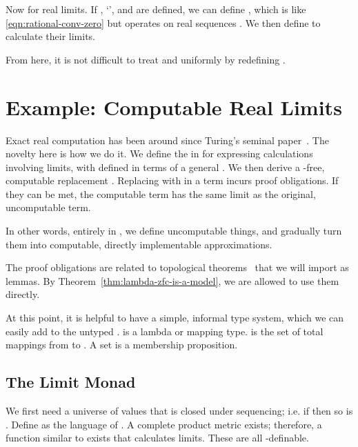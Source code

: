 Now for real limits. If \tlzfc{\Re^+}, `\tlzfc{<}', and \tlzfc{|\cdot|} are defined, we can define , which is like \eqref{eqn:rational-conv-zero} but operates on real sequences . We then define  to calculate their limits.

From here, it is not difficult to treat \tlzfc{\Rat} and \tlzfc{\Re} uniformly by redefining \tlzfc{\Rat \subset \Re}.


\section{Example: Computable Real Limits}

\newcommand{\seqtype}[1]{\lnat \to {#1}}

Exact real computation has been around since Turing's seminal paper~\cite{cit:turing}. The novelty here is how we do it. We define the  in \targetlang for expressing calculations involving limits, with  defined in terms of a general . We then derive a -free, computable replacement . Replacing  with  in a \targetlang term incurs proof obligations. If they can be met, the computable \targetlang term has the same limit as the original, uncomputable term.

In other words, entirely in \targetlang, we define uncomputable things, and gradually turn them into computable, directly implementable approximations.

The proof obligations are related to topological theorems~\cite{cit:munkres-topology} that we will import as lemmas. By Theorem~\ref{thm:lambda-zfc-is-a-model}, we are allowed to use them directly.

At this point, it is helpful to have a simple, informal type system, which we can easily add to the untyped \targetlang.  is a lambda or mapping type.  is the set of total mappings from  to . A set is a membership proposition.


\subsection{The Limit Monad}

\newcommand{\metricuniv}{\mathbb{U}}

We first need a universe \tlzfc{\metricuniv} of values that is closed under sequencing; i.e. if \tlzfc{A \subset \metricuniv} then so is . Define \tlzfc{\metricuniv} as the language of . A complete product metric \tlzfc{\delta : \metricuniv \tto \metricuniv \tto \Re} exists; therefore, a function \tlzfc{limit : (\lnat \to \metricuniv) \tto \metricuniv} similar to  exists that calculates limits. These are all \targetlang-definable.

